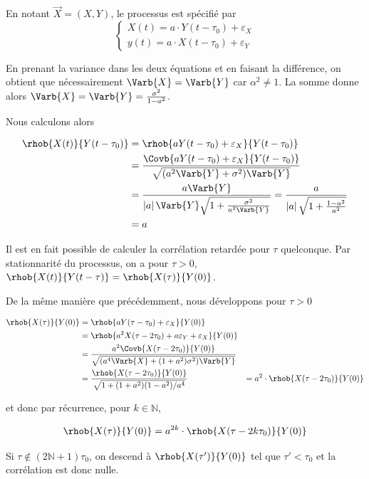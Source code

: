 En notant $\vec{X} = (X,Y)$, le processus est spécifié par
\[
\begin{cases}
	X(t) = a\cdot Y(t-\tau_0) + \varepsilon_X \\
	y(t) = a\cdot X(t-\tau_0) + \varepsilon_Y
\end{cases}
\]


En prenant la variance dans les deux équations et en faisant la différence, on obtient que nécessairement $\Varb{X} = \Varb{Y}$ car $\alpha^2 \neq 1$. La somme donne alors $\Varb{X} = \Varb{Y} = \frac{\sigma^2}{1 - a^2}$.

Nous calculons alors 

\[
\begin{split}
	\rhob{X(t)}{Y(t-\tau_0)} & = \rhob{aY(t-\tau_0)+\varepsilon_X}{Y(t-\tau_0)}\\
	& = \frac{\Covb{aY(t-\tau_0)+\varepsilon_X}{Y(t-\tau_0)}}{\sqrt{(a^2\Varb{Y} + \sigma^2)\Varb{Y}}} \\
	& = \frac{a\Varb{Y}}{\left|a\right|\Varb{Y}\sqrt{1 + \frac{\sigma^2}{a^2\Varb{Y}}}} = \frac{a}{\left|a\right|\sqrt{1 + \frac{1 - a^2}{a^2}}}\\
	& = a
\end{split}
\]

Il est en fait possible de calculer la corrélation retardée pour $\tau$ quelconque. Par stationnarité du processus, on a pour $\tau > 0$, $\rhob{X(t)}{Y(t-\tau)} = \rhob{X(\tau)}{Y(0)}$.

De la même manière que précédemment, nous développons pour $\tau > 0$

\[
\begin{split}
	\rhob{X(\tau)}{Y(0)} & = \rhob{aY(\tau - \tau_0) + \varepsilon_X}{Y(0)}\\
	 & = \rhob{a^2 X(\tau - 2\tau_0) + a \varepsilon_Y + \varepsilon_X}{Y(0)}\\
	 & = \frac{a^2\Covb{X(\tau - 2\tau_0)}{Y(0)}}{\sqrt{(a^4\Varb{X} + (1+a^2)\sigma^2)\Varb{Y}}}\\
	 & = \frac{\rhob{X(\tau-2\tau_0)}{Y(0)}}{\sqrt{1 + (1+a^2)(1-a^2)/a^4}}
	 & = a^2\cdot \rhob{X(\tau-2\tau_0)}{Y(0)}
\end{split}
\]

et donc par récurrence, pour $k\in \mathbb{N}$, 

\[
\rhob{X(\tau)}{Y(0)} = a^{2k}\cdot \rhob{X(\tau-2k\tau_0)}{Y(0)}
\]

Si $\tau \notin (2 \mathbb{N} + 1) \tau_0$, on descend à $\rhob{X(\tau')}{Y(0)}$ tel que $\tau' < \tau_0$ et la corrélation est donc nulle.

